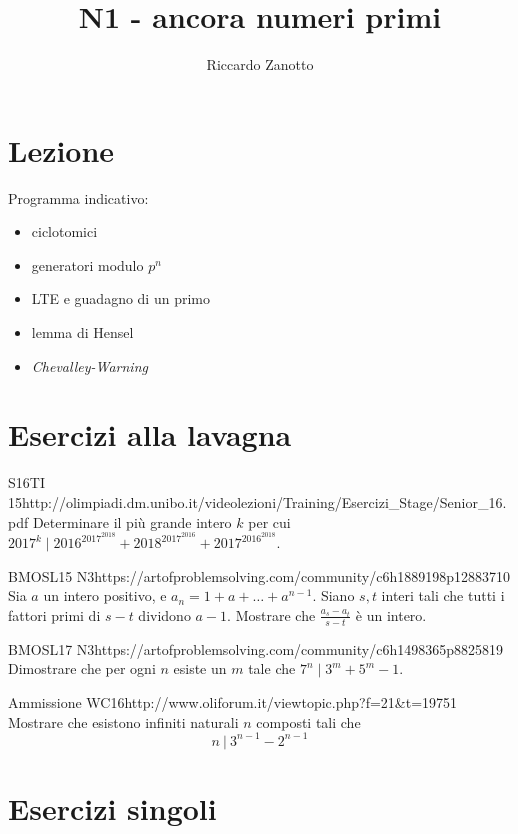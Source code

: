 \documentclass[12pt]{article}
\author{Riccardo Zanotto}
\title{N1 - ancora numeri primi}
\begin{document}
\maketitle


\section{Lezione}

Programma indicativo:

\begin{itemize}
    \item ciclotomici
    \item generatori modulo $p^n$
    \item LTE e guadagno di un primo
    \item lemma di Hensel
    \item \textit{Chevalley-Warning}
\end{itemize}

\section{Esercizi alla lavagna}

\begin{esercizio}{S16TI 15}{http://olimpiadi.dm.unibo.it/videolezioni/Training/Esercizi_Stage/Senior_16.pdf}
    Determinare il più grande intero $k$ per cui $2017^k\mid 2016^{2017^{2018}}+2018^{2017^{2016}}+2017^{2016^{2018}}$.
\end{esercizio}

\begin{esercizio}{BMOSL15 N3}{https://artofproblemsolving.com/community/c6h1889198p12883710}
    Sia $a$ un intero positivo, e $a_n=1+a+\dots+a^{n-1}$. Siano $s,t$ interi tali che tutti i fattori primi di $s-t$ dividono $a-1$. Mostrare che $\frac{a_s-a_t}{s-t}$ è un intero.
\end{esercizio}

\begin{esercizio}{BMOSL17 N3}{https://artofproblemsolving.com/community/c6h1498365p8825819}
    Dimostrare che per ogni $n$ esiste un $m$ tale che $7^n\mid 3^m+5^m-1$.
\end{esercizio}

\begin{esercizio}{Ammissione WC16}{http://www.oliforum.it/viewtopic.php?f=21&t=19751}
    Mostrare che esistono infiniti naturali $n$ composti tali che $$n \ | \ 3^{n-1}-2^{n-1}$$
\end{esercizio}

\section{Esercizi singoli}
\end{document}
